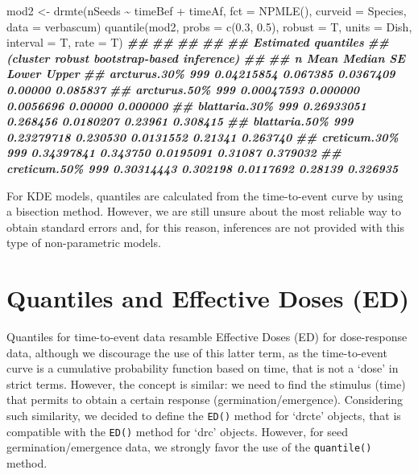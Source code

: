 \documentclass[
]{book}
\newenvironment{Shaded}{\begin{snugshade}}{\end{snugshade}}
\newcommand{\AttributeTok}[1]{\textcolor[rgb]{0.77,0.63,0.00}{#1}}
\newcommand{\DocumentationTok}[1]{\textcolor[rgb]{0.56,0.35,0.01}{\textbf{\textit{#1}}}}
\newcommand{\FloatTok}[1]{\textcolor[rgb]{0.00,0.00,0.81}{#1}}
\newcommand{\FunctionTok}[1]{\textcolor[rgb]{0.00,0.00,0.00}{#1}}
\newcommand{\NormalTok}[1]{#1}
\newcommand{\OtherTok}[1]{\textcolor[rgb]{0.56,0.35,0.01}{#1}}
\newcommand{\SpecialCharTok}[1]{\textcolor[rgb]{0.00,0.00,0.00}{#1}}
\begin{document}
\begin{Shaded}
\begin{Highlighting}[]
\NormalTok{mod2 }\OtherTok{\textless{}{-}} \FunctionTok{drmte}\NormalTok{(nSeeds }\SpecialCharTok{\textasciitilde{}}\NormalTok{ timeBef }\SpecialCharTok{+}\NormalTok{ timeAf, }\AttributeTok{fct =} \FunctionTok{NPMLE}\NormalTok{(),}
             \AttributeTok{curveid =}\NormalTok{ Species, }\AttributeTok{data =}\NormalTok{ verbascum)}
\FunctionTok{quantile}\NormalTok{(mod2, }\AttributeTok{probs =} \FunctionTok{c}\NormalTok{(}\FloatTok{0.3}\NormalTok{, }\FloatTok{0.5}\NormalTok{), }\AttributeTok{robust =}\NormalTok{ T, }\AttributeTok{units =}\NormalTok{ Dish,}
         \AttributeTok{interval =}\NormalTok{ T, }\AttributeTok{rate =}\NormalTok{ T)}
\DocumentationTok{\#\# }
\DocumentationTok{\#\# }
\DocumentationTok{\#\# }
\DocumentationTok{\#\# }
\DocumentationTok{\#\# Estimated quantiles}
\DocumentationTok{\#\# (cluster robust bootstrap{-}based inference)}
\DocumentationTok{\#\# }
\DocumentationTok{\#\#                 n       Mean   Median        SE   Lower    Upper}
\DocumentationTok{\#\# arcturus.30\%  999 0.04215854 0.067385 0.0367409 0.00000 0.085837}
\DocumentationTok{\#\# arcturus.50\%  999 0.00047593 0.000000 0.0056696 0.00000 0.000000}
\DocumentationTok{\#\# blattaria.30\% 999 0.26933051 0.268456 0.0180207 0.23961 0.308415}
\DocumentationTok{\#\# blattaria.50\% 999 0.23279718 0.230530 0.0131552 0.21341 0.263740}
\DocumentationTok{\#\# creticum.30\%  999 0.34397841 0.343750 0.0195091 0.31087 0.379032}
\DocumentationTok{\#\# creticum.50\%  999 0.30314443 0.302198 0.0117692 0.28139 0.326935}
\end{Highlighting}
\end{Shaded}

For KDE models, quantiles are calculated from the time-to-event curve by using a bisection method. However, we are still unsure about the most reliable way to obtain standard errors and, for this reason, inferences are not provided with this type of non-parametric models.

\hypertarget{quantiles-and-effective-doses-ed}{%
\section{Quantiles and Effective Doses (ED)}\label{quantiles-and-effective-doses-ed}}

Quantiles for time-to-event data resamble Effective Doses (ED) for dose-response data, although we discourage the use of this latter term, as the time-to-event curve is a cumulative probability function based on time, that is not a `dose' in strict terms. However, the concept is similar: we need to find the stimulus (time) that permits to obtain a certain response (germination/emergence). Considering such similarity, we decided to define the \texttt{ED()} method for `drcte' objects, that is compatible with the \texttt{ED()} method for `drc' objects. However, for seed germination/emergence data, we strongly favor the use of the \texttt{quantile()} method.
\end{document}
